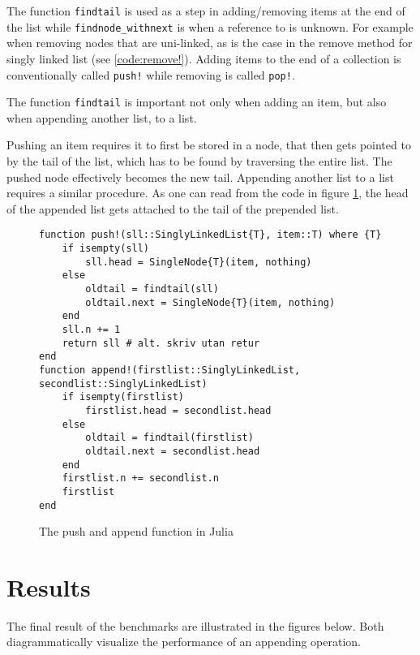 \documentclass[a4paper, 11pt]{article}
\begin{document}
    The function \texttt{findtail} is used as a step in
    adding/removing items at the end of the list 
    while \texttt{findnode_withnext} is when a reference to is unknown.
    For example when removing nodes that are uni-linked, as is the case in 
    the remove method for singly linked list (see \autoref{code:remove!}). 
    Adding items to the end of a collection 
    is conventionally called \texttt{push!} while removing is called
    \texttt{pop!}. 
    \clearpage 
    
    The function \texttt{findtail} 
    is important not only when adding an item, but also when appending another list, to a list. 

    Pushing an item requires it to first be stored in a node, that then gets pointed to 
    by the tail of the list, which has to be found by traversing the entire list. 
    The pushed node effectively becomes the new tail. Appending another list to a list
    requires a similar procedure. As one can read from the code in 
    figure \ref{code:appendfunctions}, the head of the appended list gets attached to the tail 
    of the prepended list.
    
    \begin{figure}[H]
    \begin{verbatim}
function push!(sll::SinglyLinkedList{T}, item::T) where {T}
    if isempty(sll)
        sll.head = SingleNode{T}(item, nothing)
    else
        oldtail = findtail(sll) 
        oldtail.next = SingleNode{T}(item, nothing)
    end
    sll.n += 1
    return sll # alt. skriv utan retur
end
function append!(firstlist::SinglyLinkedList, secondlist::SinglyLinkedList)
    if isempty(firstlist)
        firstlist.head = secondlist.head
    else
        oldtail = findtail(firstlist)
        oldtail.next = secondlist.head
    end
    firstlist.n += secondlist.n
    firstlist
end
    \end{verbatim}
    \caption{The push and append function in Julia}
    \label{code:appendfunctions}
    \end{figure}

    \clearpage

    \section*{Results}
    The final result of the benchmarks are illustrated in the figures below.
    Both diagrammatically visualize the performance of an appending operation. 
    
\end{document}
